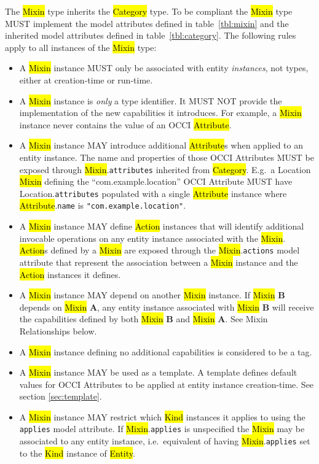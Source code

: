\documentclass[10pt,a4paper]{article}
\begin{document}
The \hl{Mixin} type inherits the \hl{Category} type. To be compliant
the \hl{Mixin} type MUST implement the model attributes defined in
table~\ref{tbl:mixin} and the inherited model attributes defined in
table~\ref{tbl:category}. The following rules apply to all instances
of the \hl{Mixin} type:
%
\begin{itemize}
  \item A \hl{Mixin} instance MUST only be associated with entity
    {\em instances}, not types, either at creation-time or run-time.

  \item A \hl{Mixin} instance is {\em only} a type identifier. It MUST NOT
    provide the implementation of the new capabilities it introduces.
    For example, a \hl{Mixin} instance never contains the value of an OCCI
    \hl{Attribute}.

  \item A \hl{Mixin} instance MAY introduce additional \hl{Attribute}s
    when applied to an entity instance. The name and properties of those
    OCCI Attributes MUST be exposed through \hl{Mixin}.{\tt attributes}
    inherited from \hl{Category}.  E.g.~a Location
    \hl{Mixin} defining the ``com.example.location'' OCCI Attribute MUST
    have Location.{\tt attributes} populated with a single \hl{Attribute}
    instance where \hl{Attribute}.{\tt name} is {\tt "com.example.location"}.

  \item A \hl{Mixin} instance MAY define \hl{Action} instances that will
    identify additional invocable operations on any entity instance
    associated with the
    \hl{Mixin}.  \hl{Action}s defined by a \hl{Mixin} are exposed
    through the \hl{Mixin}.{\tt actions} model attribute that represent the
    association between a \hl{Mixin} instance and the \hl{Action} instances it
    defines.

  \item A \hl{Mixin} instance MAY depend on another \hl{Mixin}
    instance.  If \hl{Mixin} {\bf B} depends on \hl{Mixin} {\bf A},
    any entity instance associated with \hl{Mixin} {\bf B} will
    receive the capabilities defined by both \hl{Mixin} {\bf
      B} and \hl{Mixin} {\bf A}.  See Mixin Relationships below.

  \item A \hl{Mixin} instance defining no additional
    capabilities is considered to be a tag.

  \item A \hl{Mixin} instance MAY be used as a template. A template
    defines default values for OCCI Attributes to be applied at entity instance
    creation-time. See section \ref{sec:template}.

  \item A \hl{Mixin} instance MAY restrict which \hl{Kind} instances it applies
    to using the {\tt applies} model attribute.  If \hl{Mixin}.{\tt applies}
    is unspecified the \hl{Mixin} may be associated to any entity instance,
    i.e.~equivalent of having \hl{Mixin}.{\tt applies} set to the \hl{Kind}
    instance of \hl{Entity}.

\end{itemize}
\end{document}
